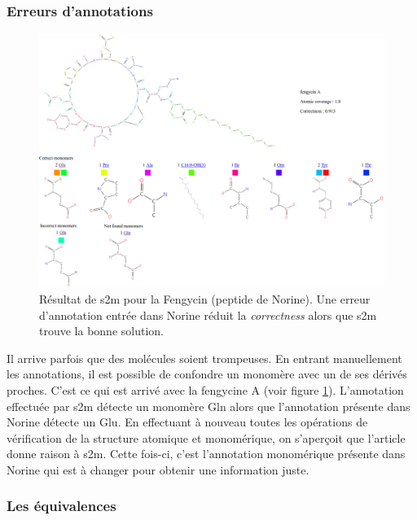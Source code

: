 \subsubsection{Erreurs d'annotations}

\begin{figure}[h!]
  \begin{center}
    \includegraphics[width=450px]{Figures/s2m/results/fengycin.png}
    \caption{\label{fengycin}Résultat de s2m pour la Fengycin (peptide de Norine).
    Une erreur d'annotation entrée dans Norine réduit la \textit{correctness} alors que s2m trouve la bonne solution.}
  \end{center}
\end{figure}

Il arrive parfois que des molécules soient trompeuses.
En entrant manuellement les annotations, il est possible de confondre un monomère avec un de ses dérivés proches.
C'est ce qui est arrivé avec la fengycine A (voir figure \ref{fengycin}).
L'annotation effectuée par s2m détecte un monomère Gln alors que l'annotation présente dans Norine détecte un Glu.
En effectuant à nouveau toutes les opérations de vérification de la structure atomique et monomérique, on s'aperçoit que l'article~\cite{wu_nonribosomal_2007} donne raison à s2m.
Cette fois-ci, c'est l'annotation monomérique présente dans Norine qui est à changer pour obtenir une information juste.


\subsubsection{Les équivalences}

